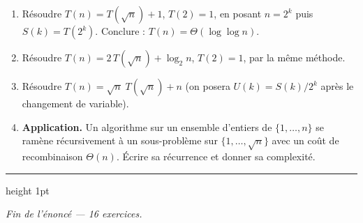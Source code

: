 \documentclass[11pt,a4paper]{article}
\begin{document}
\begin{enumerate}[label=\arabic*.,leftmargin=*]
  \item Résoudre $T(n) = T(\sqrt{n}) + 1$, $T(2)=1$, en posant $n = 2^{k}$ puis
        $S(k)=T(2^{k})$. Conclure : $T(n)=\Theta(\log\log n)$.
  \item Résoudre $T(n) = 2\,T(\sqrt{n}) + \log_2 n$, $T(2)=1$, par la même méthode.
  \item Résoudre $T(n) = \sqrt{n}\; T(\sqrt{n}) + n$ (on posera $U(k)=S(k)/2^{k}$
        après le changement de variable).
  \item \textbf{Application.} Un algorithme sur un ensemble d'entiers de $\{1,\dots,n\}$
        se ramène récursivement à un sous-problème sur $\{1,\dots,\sqrt n\}$ avec un coût
        de recombinaison $\Theta(n)$. Écrire sa récurrence et donner sa complexité.
\end{enumerate}

\vspace{14pt}
{\color{teal}\hrule height 1pt}
\vspace{6pt}
\begin{center}
\small\itshape Fin de l'énoncé --- 16 exercices.
\end{center}
\end{document}
